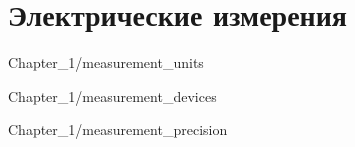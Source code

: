\documentclass[a4paper,oneside]{book}
\begin{document}
\chapter{Электрические измерения}


 {Chapter_1/measurement_units}

 {Chapter_1/measurement_devices}

 {Chapter_1/measurement_precision}
\end{document}

